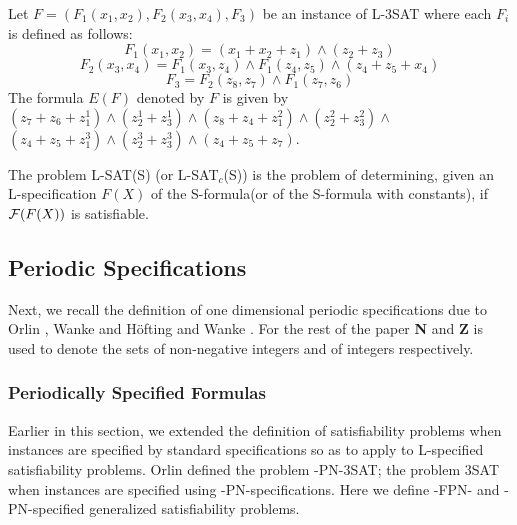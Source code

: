 \begin{example}
Let $F= (F_1(x_1,x_2),F_{2}(x_3,x_4), F_3)$
be an instance of {\sf L-3SAT} where each $F_i$ is defined as follows:
\[F_1(x_1,x_2) = (x_1 + x_2 + z_1) \wedge (z_2 + z_3) \]
\[F_2(x_3,x_4) = F_1(x_3, z_4) \wedge F_1(z_4, z_5) \wedge
                               (z_4 + z_5 + x_4)   \]
\[F_3 = F_2(z_8,z_7) \wedge  F_1(z_7,z_6) \]
The formula $E(F)$ denoted by $F$ is given by 
$ (z_7 + z_6 + z_1^1) \wedge (z_2^1 + z_3^1) \wedge
(z_8 + z_4 + z_1^2) \wedge (z_2^2 + z_3^2) \wedge $
$(z_4 + z_5 + z_1^3) \wedge (z_2^3 + z_3^3) \wedge (z_4 + z_5 + z_7)$. 

\end{example}


\begin{definition}
The problem {\sf L-SAT(S)} (or {\sf L-SAT}$_c${\sf (S)}) is the
problem of determining, given an L-specification $F(X)$ of the S-formula(or of
the S-formula with constants), if ${\cal F}(F(X))$ is satisfiable.
\end{definition}
 






\subsection{Periodic Specifications }\label{sec:fpn_spec}
Next, we recall the definition of one dimensional periodic specifications 
due to  Orlin \cite{Or82a}, Wanke \cite{Wa93} and 
H\"ofting and Wanke \cite{HW92}. 
For the rest of the paper {\bf N} and {\bf Z} is used to 
denote the sets of non-negative integers and of integers respectively.



\subsubsection{Periodically Specified Formulas}
Earlier in this section, we extended
the definition of satisfiability problems when instances are specified
by standard specifications so as to apply to 
{\sf L}-specified satisfiability problems. Orlin \cite{Or82a} 
defined the problem {-PN-3SAT}; the problem {\sf 3SAT} when 
instances are specified using {-PN}-specifications.
Here we define {-FPN}- and {-PN}-specified generalized satisfiability
problems.




